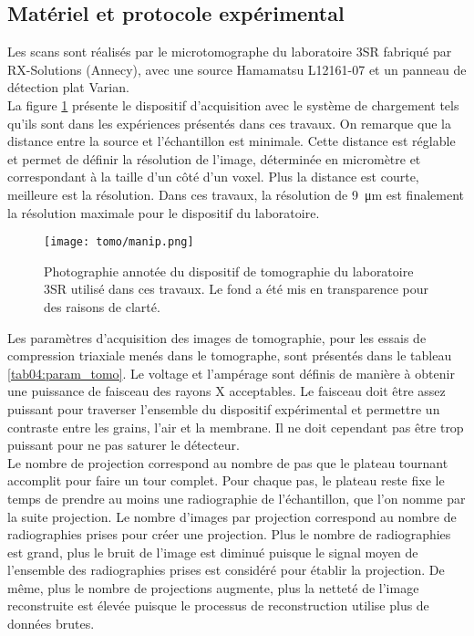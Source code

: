 	\subsection{Matériel et protocole expérimental}
		Les scans sont réalisés par le microtomographe du laboratoire 3SR fabriqué par RX-Solutions (Annecy), avec une source Hamamatsu L12161-07 et un panneau de détection plat Varian.
		\\La figure \ref{fig04:manip_tomo} présente le dispositif d'acquisition avec le système de chargement tels qu'ils sont dans les expériences présentés dans ces travaux. On remarque que la distance entre la source et l'échantillon est minimale. Cette distance est réglable et permet de définir la résolution de l'image, déterminée en micromètre et correspondant à la taille d'un côté d'un voxel. Plus la distance est courte, meilleure est la résolution. Dans ces travaux, la résolution de \SI{9}{\micro\meter} est finalement la résolution maximale pour le dispositif du laboratoire.
		\begin{figure}\centering
			\texttt{[image: tomo/manip.png]}
			\caption{\label{fig04:manip_tomo}Photographie annotée du dispositif de tomographie du laboratoire 3SR utilisé dans ces travaux. Le fond a été mis en transparence pour des raisons de clarté.}
		\end{figure}
		Les paramètres d'acquisition des images de tomographie, pour les essais de compression triaxiale menés dans le tomographe, sont présentés dans le tableau \ref{tab04:param_tomo}. Le voltage et l'ampérage sont définis de manière à obtenir une puissance de faisceau des rayons X acceptables. Le faisceau doit être assez puissant pour traverser l'ensemble du dispositif expérimental et permettre un contraste entre les grains, l'air et la membrane. Il ne doit cependant pas être trop puissant pour ne pas saturer le détecteur.
		\\Le nombre de projection correspond au nombre de pas que le plateau tournant accomplit pour faire un tour complet. Pour chaque pas, le plateau reste fixe le temps de prendre au moins une radiographie de l'échantillon, que l'on nomme par la suite projection. Le nombre d'images par projection correspond au nombre de radiographies prises pour créer une projection. Plus le nombre de radiographies est grand, plus le bruit de l'image est diminué puisque le signal moyen de l'ensemble des radiographies prises est considéré pour établir la projection. De même, plus le nombre de projections augmente, plus la netteté de l'image reconstruite est élevée puisque le processus de reconstruction utilise plus de données brutes.
